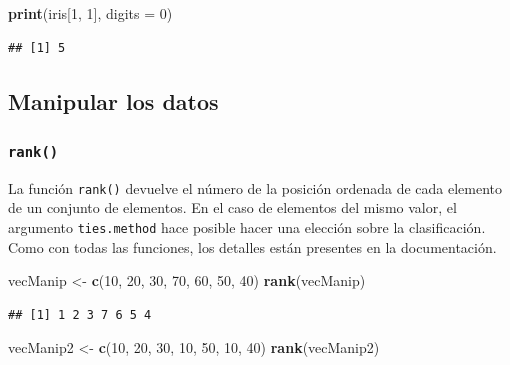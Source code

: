 \documentclass[
]{book}
\newenvironment{Shaded}{\begin{snugshade}}{\end{snugshade}}
\newcommand{\DataTypeTok}[1]{\textcolor[rgb]{0.13,0.29,0.53}{#1}}
\newcommand{\DecValTok}[1]{\textcolor[rgb]{0.00,0.00,0.81}{#1}}
\newcommand{\KeywordTok}[1]{\textcolor[rgb]{0.13,0.29,0.53}{\textbf{#1}}}
\newcommand{\NormalTok}[1]{#1}
\newcommand{\StringTok}[1]{\textcolor[rgb]{0.31,0.60,0.02}{#1}}
\begin{document}
\begin{Shaded}
\begin{Highlighting}[]
\KeywordTok{print}\NormalTok{(iris[}\DecValTok{1}\NormalTok{, }\DecValTok{1}\NormalTok{], }\DataTypeTok{digits =} \DecValTok{0}\NormalTok{)}
\end{Highlighting}
\end{Shaded}

\begin{verbatim}
## [1] 5
\end{verbatim}

\hypertarget{manipular-los-datos}{%
\subsection{Manipular los datos}\label{manipular-los-datos}}

\hypertarget{l015rank}{%
\subsubsection{\texorpdfstring{\texttt{rank()}}{rank()}}\label{l015rank}}

La función \texttt{rank()} devuelve el número de la posición ordenada de cada elemento de un conjunto de elementos. En el caso de elementos del mismo valor, el argumento \texttt{ties.method} hace posible hacer una elección sobre la clasificación. Como con todas las funciones, los detalles están presentes en la documentación.

\begin{Shaded}
\begin{Highlighting}[]
\NormalTok{vecManip <-}\StringTok{ }\KeywordTok{c}\NormalTok{(}\DecValTok{10}\NormalTok{, }\DecValTok{20}\NormalTok{, }\DecValTok{30}\NormalTok{, }\DecValTok{70}\NormalTok{, }\DecValTok{60}\NormalTok{, }\DecValTok{50}\NormalTok{, }\DecValTok{40}\NormalTok{)}
\KeywordTok{rank}\NormalTok{(vecManip)}
\end{Highlighting}
\end{Shaded}

\begin{verbatim}
## [1] 1 2 3 7 6 5 4
\end{verbatim}

\begin{Shaded}
\begin{Highlighting}[]
\NormalTok{vecManip2 <-}\StringTok{ }\KeywordTok{c}\NormalTok{(}\DecValTok{10}\NormalTok{, }\DecValTok{20}\NormalTok{, }\DecValTok{30}\NormalTok{, }\DecValTok{10}\NormalTok{, }\DecValTok{50}\NormalTok{, }\DecValTok{10}\NormalTok{, }\DecValTok{40}\NormalTok{)}
\KeywordTok{rank}\NormalTok{(vecManip2)}
\end{Highlighting}
\end{Shaded}
\end{document}
